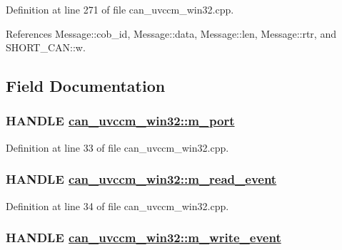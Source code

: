 Definition at line 271 of file can\_\-uvccm\_\-win32.cpp.

References Message::cob\_\-id, Message::data, Message::len, Message::rtr, and SHORT\_\-CAN::w.

\subsection{Field Documentation}
\hypertarget{classcan__uvccm__win32_3f13c1748b3cd57fd1d478782428859a}{
\subsubsection[m\_\-port]{\setlength{\rightskip}{0pt plus 5cm}HANDLE \hyperlink{classcan__uvccm__win32_3f13c1748b3cd57fd1d478782428859a}{can\_\-uvccm\_\-win32::m\_\-port}}}
\label{classcan__uvccm__win32_3f13c1748b3cd57fd1d478782428859a}




Definition at line 33 of file can\_\-uvccm\_\-win32.cpp.\hypertarget{classcan__uvccm__win32_cf25e6725871137696ab41b06fa05417}{
\subsubsection[m\_\-read\_\-event]{\setlength{\rightskip}{0pt plus 5cm}HANDLE \hyperlink{classcan__uvccm__win32_cf25e6725871137696ab41b06fa05417}{can\_\-uvccm\_\-win32::m\_\-read\_\-event}}}
\label{classcan__uvccm__win32_cf25e6725871137696ab41b06fa05417}




Definition at line 34 of file can\_\-uvccm\_\-win32.cpp.\hypertarget{classcan__uvccm__win32_544ea7fd0e8a5d7cfb7cf9058d6020a4}{
\subsubsection[m\_\-write\_\-event]{\setlength{\rightskip}{0pt plus 5cm}HANDLE \hyperlink{classcan__uvccm__win32_544ea7fd0e8a5d7cfb7cf9058d6020a4}{can\_\-uvccm\_\-win32::m\_\-write\_\-event}}}
\label{classcan__uvccm__win32_544ea7fd0e8a5d7cfb7cf9058d6020a4}




